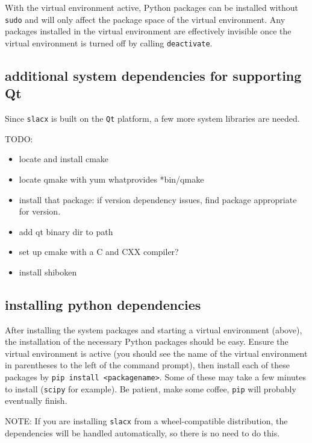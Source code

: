 With the virtual environment active,
Python packages can be installed without \verb|sudo|
and will only affect the package space of the virtual environment.
Any packages installed in the virtual environment are effectively invisible
once the virtual environment is turned off by calling \verb|deactivate|.


\subsection{additional system dependencies for supporting Qt}

Since \verb|slacx| is built on the \verb|Qt| platform,
a few more system libraries are needed.

TODO:
\begin{itemize}
\item locate and install cmake
\item locate qmake with yum whatprovides *bin/qmake
\item install that package: if version dependency issues, find package appropriate for version.
\item add qt binary dir to path
\item set up cmake with a C and CXX compiler?
\item install shiboken
\end{itemize}

\subsection{installing python dependencies}

After installing the system packages and starting a virtual environment (above),
the installation of the necessary Python packages should be easy.
Ensure the virtual environment is active
(you should see the name of the virtual environment 
in parentheses to the left of the command prompt),
then install each of these packages by \verb|pip install <packagename>|.
Some of these may take a few minutes to install (\verb|scipy| for example).
Be patient, make some coffee, \verb|pip| will probably eventually finish.

NOTE: If you are installing \verb|slacx| 
from a wheel-compatible distribution, 
the dependencies will be handled automatically,
so there is no need to do this.


